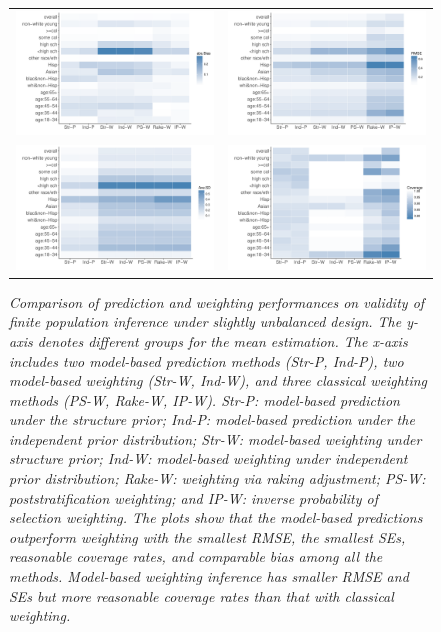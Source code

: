 \documentclass[11pt]{article}
\begin{document}
\begin{figure}
\centering
\begin{tabular}{cc}
\includegraphics[width=.475\textwidth]{plot/var3_bias_case1.pdf}&
\includegraphics[width=.475\textwidth]{plot/var3_rmse_case1.pdf}\\
\includegraphics[width=.475\textwidth]{plot/var3_se_case1.pdf}&
\includegraphics[width=.475\textwidth]{plot/var3_cr_case1.pdf}\\
\end{tabular}
\caption{\em Comparison of prediction and weighting performances on validity of finite population inference under slightly unbalanced design. The y-axis denotes different groups for the mean estimation. The x-axis includes two model-based prediction methods (Str-P, Ind-P), two model-based weighting (Str-W, Ind-W), and three classical weighting methods (PS-W, Rake-W, IP-W). Str-P: model-based prediction under the structure prior; Ind-P: model-based prediction under the independent prior distribution; Str-W: model-based weighting under structure prior; Ind-W: model-based weighting under independent prior distribution; Rake-W: weighting via raking adjustment; PS-W: poststratification weighting; and IP-W: inverse probability of selection weighting. The plots show that the model-based predictions outperform weighting with the smallest RMSE, the smallest SEs, reasonable coverage rates, and comparable bias among all the methods. Model-based weighting inference has smaller RMSE and SEs but more reasonable coverage rates than that with classical weighting.}
\label{sim1}
\end{figure}
\end{document}
